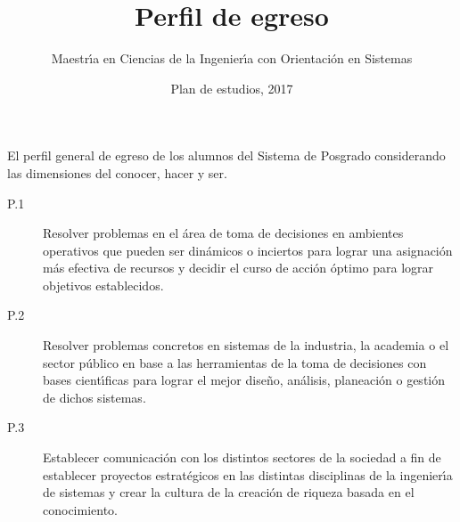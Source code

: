 \documentclass{article}
\title{Perfil de egreso}
\author{Maestr\'{\i}a en Ciencias de la Ingenier\'{\i}a con Orientaci\'{o}n en Sistemas}
\date{Plan de estudios, 2017}
\begin{document}
\maketitle

El perfil general de egreso de los alumnos del Sistema de Posgrado
considerando las dimensiones del conocer, hacer y ser.

\begin{description}
\item[P.1]{Resolver problemas en el \'{a}rea de toma de decisiones en
    ambientes operativos que pueden ser din\'{a}micos o inciertos para
    lograr una asignaci\'{o}n m\'{a}s efectiva de recursos y decidir el curso
    de acci\'{o}n \'{o}ptimo para lograr objetivos establecidos.}
\item[P.2]{Resolver problemas concretos en sistemas de la industria,
    la academia o el sector p\'{u}blico en base a las herramientas de la
    toma de decisiones con bases cient\'{\i}ficas para lograr el mejor
    dise\~{n}o, an\'{a}lisis, planeaci\'{o}n o gesti\'{o}n de dichos sistemas.}
\item[P.3]{Establecer comunicaci\'{o}n con los distintos sectores de la
    sociedad a fin de establecer proyectos estrat\'{e}gicos en las
    distintas disciplinas de la ingenier\'{\i}a de sistemas y crear la
    cultura de la creaci\'{o}n de riqueza basada en el conocimiento.}
\end{description}
  
\end{document}
